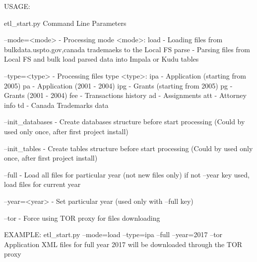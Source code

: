U\+S\+A\+GE\+: \begin{DoxyVerb}etl_start.py Command Line Parameters

--mode=<mode> - Processing mode
   <mode>:
          load  - Loading files from bulkdata.uspto.gov,canada trademaeks to the Local FS
          parse - Parsing files from Local FS and bulk load parsed data into Impala or Kudu tables

--type=<type> - Processing files type
   <type>:
          ipa - Application (starting from 2005)
          pa  - Application (2001 - 2004)
          ipg - Grants (starting from 2005)
          pg  - Grants (2001 - 2004)
          fee - Transactions history
          ad  - Assignments
          att - Attorney info
          td  - Canada Trademarks data

--init_databases - Create databases structure before start processing (Could by used only once, after first project install)

--init_tables - Create tables structure before start processing (Could by used only once, after first project install)

--full - Load all files for particular year (not new files only) if not --year key used, load files for current year

--year=<year> - Set particular year (used only with --full key)

--tor - Force using TOR proxy for files downloading

EXAMPLE: etl_start.py --mode=load --type=ipa --full --year=2017 --tor
         Application XML files for full year 2017 will be downloaded through the TOR proxy
\end{DoxyVerb}
 